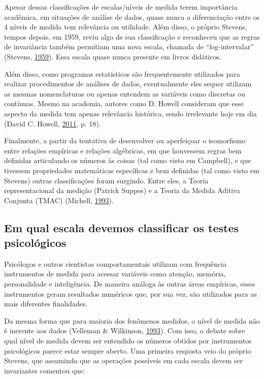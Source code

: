 \documentclass[
]{book}
\begin{document}
Apesar dessas classificações de escalas/níveis de medida terem
importância acadêmica, em situações de análise de dados, quase nunca a
diferenciação entre os 4 níveis de medida tem relevância ou utilidade.
Além disso, o próprio Stevens, tempos depois, em 1959, reviu algo de sua
classificação e reconheceu que as regras de invariância também permitiam
uma nova escala, chamada de ``log-intervalar'' (Stevens,
\protect\hyperlink{ref-stevens1959}{1959}). Essa escala quase nunca
presente em livros didáticos.

Além disso, como programas estatísticos são frequentemente utilizados
para realizar procedimentos de análises de dados, eventualmente eles
sequer utilizam as mesmas nomenclaturas ou apenas entendem as variáveis
como discretas ou contínuas. Mesmo na academia, autores como D. Howell
consideram que esse aspecto da medida tem apenas relevância histórica,
sendo irrelevante hoje em dia (David C. Howell,
\protect\hyperlink{ref-howell2011}{2011}, p. 18).

Finalmente, a partir da tentativa de desenvolver ou aperfeiçoar o
isomorfismo entre relações empíricas e relações algébricas, em que
houvessem regras bem definidas articulando os números às coisas (tal
como visto em Campbell), e que tivessem propriedades matemáticas
específicas e bem definidas (tal como visto em Stevens) outras
classificações foram surgindo. Entre eles, a Teoria representacional da
medição (Patrick Suppes) e a Teoria da Medida Aditiva Conjunta (TMAC)
(Michell, \protect\hyperlink{ref-Michell1993}{1993}).

\hypertarget{em-qual-escala-devemos-classificar-os-testes-psicoluxf3gicos}{%
\subsection{Em qual escala devemos classificar os testes
psicológicos}\label{em-qual-escala-devemos-classificar-os-testes-psicoluxf3gicos}}

Psicólogos e outros cientistas comportamentais utilizam com frequência
instrumentos de medida para acessar variáveis como atenção, memória,
personalidade e inteligência. De maneira análoga às outras áreas
empíricas, esses instrumentos geram resultados numéricos que, por sua
vez, são utilizados para as mais diferentes finalidades.

Da mesma forma que para maioria dos fenômenos medidos, o nível de medida
não é inerente aos dados (Velleman \& Wilkinson,
\protect\hyperlink{ref-Velleman1993}{1993}). Com isso, o debate sobre
qual nível de medida devem ser entendido os números obtidos por
instrumentos psicológicos parece estar sempre aberto. Uma primeira
resposta veio do próprio Stevens, que assumindo que as operações
possíveis em cada escala devem ser invariantes comentou que:
\end{document}
